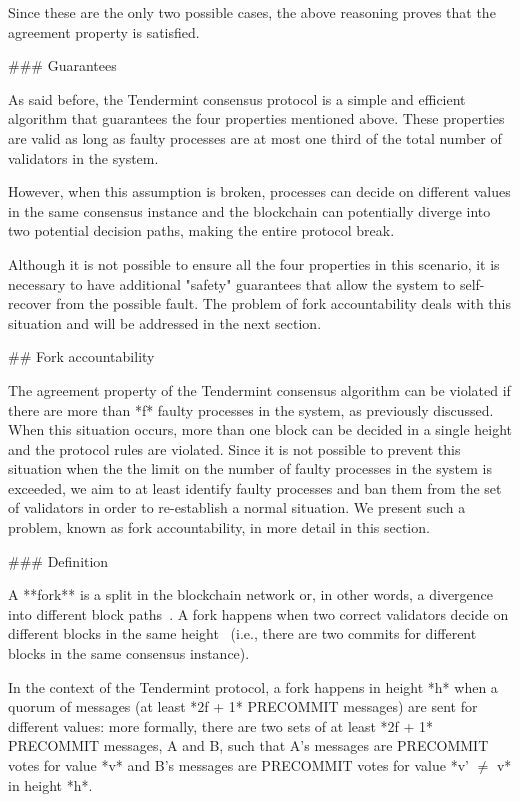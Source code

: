 \documentclass[a4paper,11pt,oneside]{report}
\begin{document}
\begin{markdown}
Since these are the only two possible cases, the above reasoning proves that the agreement property is satisfied.

### Guarantees 

As said before, the Tendermint consensus protocol is a simple and efficient algorithm that guarantees the four properties mentioned above. These properties are valid as long as faulty processes are at most one third of the total number of validators in the system.

However, when this assumption is broken, processes can decide on different values in the same consensus instance and the blockchain can potentially diverge into two potential decision paths, making the entire protocol break.

Although it is not possible to ensure all the four properties in this scenario, it is necessary to have additional "safety" guarantees that allow the system to self-recover from the possible fault. The problem of fork accountability deals with this situation and will be addressed in the next section.

## Fork accountability

The agreement property of the Tendermint consensus algorithm can be violated if there are more than *f* faulty processes in the system, as previously discussed. When this situation occurs, more than one block can be decided in a single height and the protocol rules are violated. Since it is not possible to prevent this situation when the the limit on the number of faulty processes in the system is exceeded, we aim to at least identify faulty processes and ban them from the set of validators in order to re-establish a normal situation. We present such a problem, known as fork accountability, in more detail in this section.  

### Definition

A **fork** is a split in the blockchain network or, in other words, a divergence into different block paths~\cite{wiki:fork}. 
A fork happens when two correct validators decide on different blocks in the same height~\cite{fork-accountability-overview} (i.e., there are two commits for different blocks in the same consensus instance). 

In the context of the Tendermint protocol, a fork happens in height *h* when a quorum of messages (at least *2f + 1* PRECOMMIT messages) are sent for different values: more formally, there are two sets of at least *2f + 1* PRECOMMIT messages, A and B, such that A's messages are PRECOMMIT votes for value *v* and B's messages are PRECOMMIT votes for value *v' $\neq$ v* in height *h*.


\end{markdown}
\end{document}
